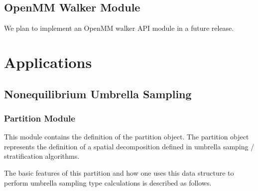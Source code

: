 \documentclass[letterpaper,10pt,english]{sphinxmanual}
\begin{document}
\section{OpenMM Walker Module}
\label{walker_api/walker_api.doc:openmm-walker-module}
We plan to implement an OpenMM walker API module in a future release.


\chapter{Applications}
\label{applications/applications.doc:applications}\label{applications/applications.doc::doc}

\section{Nonequilibrium Umbrella Sampling}
\label{applications/applications.doc:nonequilibrium-umbrella-sampling}

\subsection{Partition Module}
\label{applications/applications.doc:module-partition}\label{applications/applications.doc:partition-module}
This module contains the definition of the partition object. The partition object represents the definition of a 
spatial decomposition defined in umbrella samping / stratification algorithms.

The basic features of this partition and how one uses this data structure to perform umbrella sampling type calculations
is described as follows.
\end{document}
